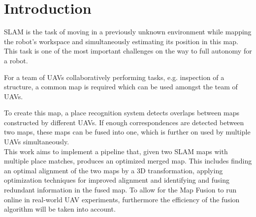 \chapter{Introduction}
\label{sec:introduction}

\acf{SLAM} is the task of moving in a previously unknown environment while mapping the robot’s workspace and simultaneously estimating its position in this map. This task is one of the most important challenges on the way to full autonomy for a robot.

For a team of \acfp{UAV} collaboratively performing tasks, e.g. inspection of a structure, a common map is required which can be used amongst the team of \acp{UAV}.

To create this map, a place recognition system detects overlaps between maps constructed by different \acp{UAV}. If enough correspondences are detected between two maps, these maps can be fused into one, which is further on used by multiple \acp{UAV} simultaneously.\\

This work aims to implement a pipeline that, given two SLAM maps with multiple place matches, produces an optimized merged map. This includes finding an optimal alignment of the two maps by a 3D transformation, applying optimization techniques for improved alignment and identifying and fusing redundant information in the fused map. To allow for the Map Fusion to run online in real-world UAV experiments, furthermore the efficiency of the fusion algorithm will be taken into account.





